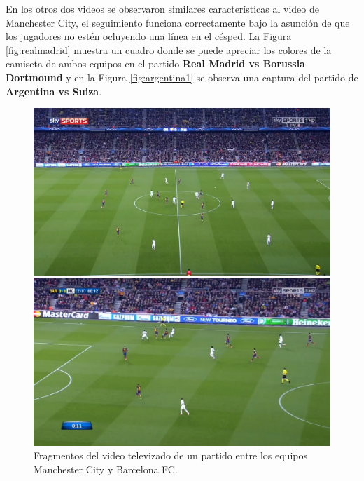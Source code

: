 En los otros dos videos se observaron similares características al video de
Manchester City, el seguimiento funciona correctamente bajo la asunción de que
los jugadores no estén ocluyendo una línea en el césped. La Figura
\ref{fig:realmadrid} muestra un cuadro donde se puede apreciar los colores de
la camiseta de ambos equipos en el partido \textbf{Real Madrid vs Borussia
Dortmound} y en la Figura \ref{fig:argentina1} se observa una captura del
partido de \textbf{Argentina vs Suiza}.


\begin{figure}[H]
    \centering
    \begin{minipage}[t]{.45\textwidth}
        \centering
        \includegraphics[width=\linewidth]{./images/manchester1.png}
    \end{minipage}%
    \vspace{0.1cm}
    \begin{minipage}[t]{.45\textwidth}
        \centering
        \includegraphics[width=\linewidth]{./images/manchester2.png}
    \end{minipage}
    \caption{Fragmentos del video televizado de un partido entre los equipos Manchester City y Barcelona FC.
        \label{fig:manchester1}}
\end{figure}


